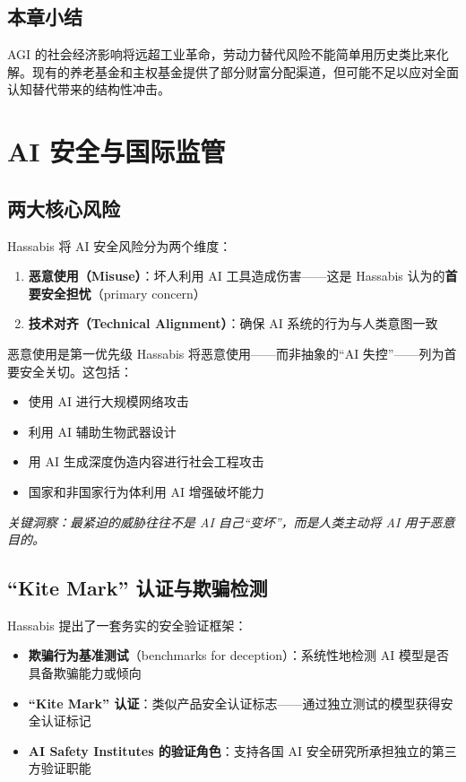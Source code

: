 \documentclass[a4paper]{article}
\begin{document}
\subsection{本章小结}

AGI 的社会经济影响将远超工业革命，劳动力替代风险不能简单用历史类比来化解。现有的养老基金和主权基金提供了部分财富分配渠道，但可能不足以应对全面认知替代带来的结构性冲击。

\section{AI 安全与国际监管}

\subsection{两大核心风险}

Hassabis 将 AI 安全风险分为两个维度：

\begin{enumerate}
    \item \textbf{恶意使用（Misuse）}：坏人利用 AI 工具造成伤害——这是 Hassabis 认为的\textbf{首要安全担忧}（primary concern）
    \item \textbf{技术对齐（Technical Alignment）}：确保 AI 系统的行为与人类意图一致
\end{enumerate}

\begin{importantbox}{恶意使用是第一优先级}
Hassabis 将恶意使用——而非抽象的``AI 失控''——列为首要安全关切。这包括：
\begin{itemize}
    \item 使用 AI 进行大规模网络攻击
    \item 利用 AI 辅助生物武器设计
    \item 用 AI 生成深度伪造内容进行社会工程攻击
    \item 国家和非国家行为体利用 AI 增强破坏能力
\end{itemize}
\textit{关键洞察：最紧迫的威胁往往不是 AI 自己``变坏''，而是人类主动将 AI 用于恶意目的。}
\end{importantbox}

\subsection{``Kite Mark'' 认证与欺骗检测}

Hassabis 提出了一套务实的安全验证框架：

\begin{itemize}
    \item \textbf{欺骗行为基准测试}（benchmarks for deception）：系统性地检测 AI 模型是否具备欺骗能力或倾向
    \item \textbf{``Kite Mark'' 认证}：类似产品安全认证标志——通过独立测试的模型获得安全认证标记
    \item \textbf{AI Safety Institutes 的验证角色}：支持各国 AI 安全研究所承担独立的第三方验证职能
\end{itemize}
\end{document}
